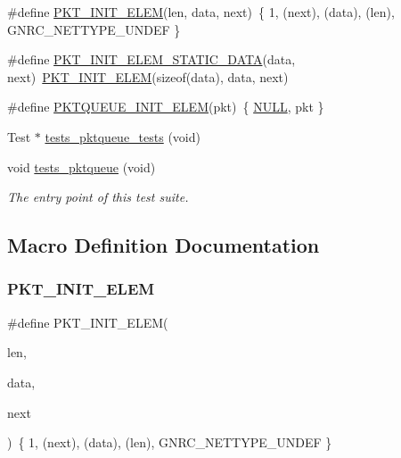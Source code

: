 \begin{DoxyCompactItemize}
\item 
\#define \hyperlink{tests-pktqueue_8c_ab2531718e1cc1f5064a029bd37d68769}{P\+K\+T\+\_\+\+I\+N\+I\+T\+\_\+\+E\+L\+EM}(len,  data,  next)~\{ 1, (next), (data), (len), G\+N\+R\+C\+\_\+\+N\+E\+T\+T\+Y\+P\+E\+\_\+\+U\+N\+D\+EF \}
\item 
\#define \hyperlink{tests-pktqueue_8c_af71505efb36e3b7990db43cf967770a6}{P\+K\+T\+\_\+\+I\+N\+I\+T\+\_\+\+E\+L\+E\+M\+\_\+\+S\+T\+A\+T\+I\+C\+\_\+\+D\+A\+TA}(data,  next)~\hyperlink{tests-priority__pktqueue_8c_ab2531718e1cc1f5064a029bd37d68769}{P\+K\+T\+\_\+\+I\+N\+I\+T\+\_\+\+E\+L\+EM}(sizeof(data), data, next)
\item 
\#define \hyperlink{tests-pktqueue_8c_acaa6b7d25eef99dee1c43fb8e3079312}{P\+K\+T\+Q\+U\+E\+U\+E\+\_\+\+I\+N\+I\+T\+\_\+\+E\+L\+EM}(pkt)~\{ \hyperlink{openmote-cc2538_2lwip_2src_2include_2lwip_2def_8h_a070d2ce7b6bb7e5c05602aa8c308d0c4}{N\+U\+LL}, pkt \}
\item 
Test $\ast$ \hyperlink{tests-pktqueue_8c_a3a1b15024f563f5acb4293527c3b6cf7}{tests\+\_\+pktqueue\+\_\+tests} (void)
\item 
void \hyperlink{group__unittests_ga01dc5c2a2dd69c690d952cd6e233cf60}{tests\+\_\+pktqueue} (void)
\begin{DoxyCompactList}\small\item\em The entry point of this test suite. \end{DoxyCompactList}\end{DoxyCompactItemize}


\subsection{Macro Definition Documentation}
\mbox{\label{tests-pktqueue_8c_ab2531718e1cc1f5064a029bd37d68769}} 
\subsubsection{\texorpdfstring{P\+K\+T\+\_\+\+I\+N\+I\+T\+\_\+\+E\+L\+EM}{PKT\_INIT\_ELEM}}
{\footnotesize\ttfamily \#define P\+K\+T\+\_\+\+I\+N\+I\+T\+\_\+\+E\+L\+EM(\begin{DoxyParamCaption}\item[{}]{len,  }\item[{}]{data,  }\item[{}]{next }\end{DoxyParamCaption})~\{ 1, (next), (data), (len), G\+N\+R\+C\+\_\+\+N\+E\+T\+T\+Y\+P\+E\+\_\+\+U\+N\+D\+EF \}}

